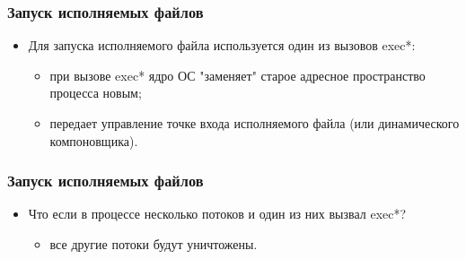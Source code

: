 \begin{frame}
\frametitle{Запуск исполняемых файлов}
\begin{itemize}
    \item<1->Для запуска исполняемого файла используется один из вызовов exec*:
    \begin{itemize}
        \item<2->при вызове exec* ядро ОС "заменяет" старое адресное
             пространство процесса новым;
        \item<3->передает управление точке входа исполняемого файла (или
             динамического компоновщика).
    \end{itemize}
\end{itemize}
\end{frame}

\begin{frame}
\frametitle{Запуск исполняемых файлов}
\begin{itemize}
    \item<1->Что если в процессе несколько потоков и один из них вызвал exec*?
    \begin{itemize}
        \item<2->все другие потоки будут уничтожены.
    \end{itemize}
\end{itemize}
\end{frame}
